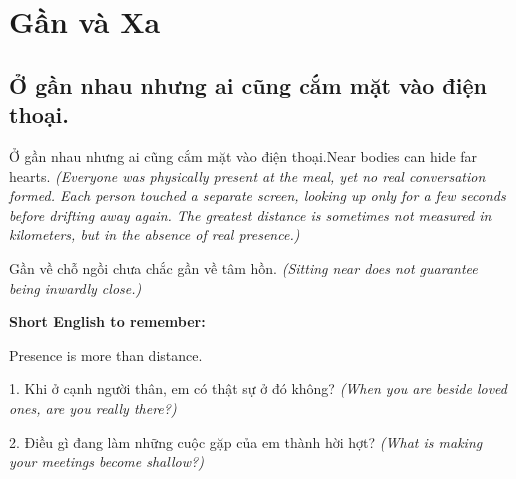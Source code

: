 \chapter{Gần và Xa}

\section{Ở gần nhau nhưng ai cũng cắm mặt vào điện thoại.}
\begin{truyen}{Ở gần nhau nhưng ai cũng cắm mặt vào điện thoại.}{Near bodies can hide far hearts.}
\textit{(Everyone was physically present at the meal, yet no real conversation formed. Each person touched a separate screen, looking up only for a few seconds before drifting away again. The greatest distance is sometimes not measured in kilometers, but in the absence of real presence.)}
\end{truyen}
\begin{baihoc}
Gần về chỗ ngồi chưa chắc gần về tâm hồn.
\textit{(Sitting near does not guarantee being inwardly close.)}
\end{baihoc}
\begin{ghinhoanh}
\textbf{Short English to remember:}

Presence is more than distance.
\end{ghinhoanh}
\begin{tuhocnhanh}
1. Khi ở cạnh người thân, em có thật sự ở đó không? \textit{(When you are beside loved ones, are you really there?)}

2. Điều gì đang làm những cuộc gặp của em thành hời hợt? \textit{(What is making your meetings become shallow?)}
\end{tuhocnhanh}
\ngancach

